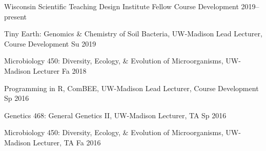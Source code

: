 

\begin{cvhonors}

\cvhonor
{Wisconsin Scientific Teaching Design Institute Fellow}
{Course Development}
{2019--present}

\cvhonor
{Tiny Earth: Genomics \& Chemistry of Soil Bacteria, UW-Madison}
{Lead Lecturer, Course Development}
{Su 2019}

\cvhonor
{Microbiology 450: Diversity, Ecology, \& Evolution of Microorganisms, UW-Madison}
{Lecturer}
{Fa 2018}

\cvhonor
{Programming in R, ComBEE, UW-Madison}
{Lead Lecturer, Course Development}
{Sp 2016}

\cvhonor
{Genetics 468: General Genetics II, UW-Madison}
{Lecturer, TA}
{Sp 2016}

\cvhonor
{Microbiology 450: Diversity, Ecology, \& Evolution of Microorganisms, UW-Madison}
{Lecturer, TA}
{Fa 2016}

\end{cvhonors}